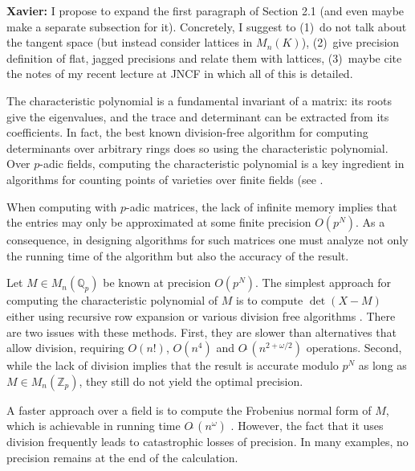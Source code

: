 \documentclass{sig-alternate-05-2015}
\newcommand{\Z}{\mathbb Z}
\newcommand{\Zp}{\Z_p}
\newcommand{\Q}{\mathbb Q}
\newcommand{\Qp}{\Q_p}
\newcommand{\softO}{O\tilde{~}}
\def\todo#1{\ \!\!{\color{red} #1}}
\newcommand{\xavier}[1]{\textcolor{answer}{{\bf Xavier:} #1}}
\begin{document}
\xavier{I propose to expand the first paragraph of Section 2.1 (and even
maybe make a separate subsection for it). Concretely, I suggest to 
(1)~do not talk about the tangent space (but instead consider lattices
in $M_n(K)$),
(2)~give precision definition of flat, jagged precisions and relate them 
with lattices,
(3)~maybe cite the notes of my recent lecture at JNCF in which all of
this is detailed.}

\bigskip

The characteristic polynomial is a fundamental invariant of a matrix: its roots
give the eigenvalues, and the trace and determinant can be extracted from its coefficients.
In fact, the best known division-free algorithm for computing determinants
over arbitrary rings \cite{kaltofen-villard:04a} does so using the characteristic polynomial.
Over $p$-adic fields, computing the characteristic polynomial is a key ingredient in
algorithms for counting points of varieties over finite fields (see
\cite{kedlaya:01a, harvey:07a, harvey:14a}.


When computing with $p$-adic matrices, the lack of infinite memory implies
that the entries may only be approximated at some finite precision $O(p^N)$.  As a
consequence, in designing algorithms for such matrices one must analyze
not only the running time of the algorithm but also the accuracy of the result.

Let $M \in M_n(\Qp)$ be known at precision $O(p^N)$.
The simplest approach for computing the characteristic polynomial of $M$
is to compute $\det(X-M)$ either using recursive row expansion or various division free
algorithms .  There are two issues
with these methods.  First, they are slower than alternatives that allow division,
requiring $O(n!)$, $O(n^4)$ and $\softO(n^{2 + \omega/2})$ operations.  Second,
while the lack of division implies that the result is accurate modulo $p^N$ as
long as $M \in M_n(\Zp)$, they still do not yield the optimal precision.

A faster approach over a field is to compute the Frobenius normal form of $M$,
which is achievable in running time $\softO(n^\omega)$ .
However, the fact that it uses division frequently leads to catastrophic losses of precision.
In many examples, no precision remains at the end of the calculation.
\end{document}
